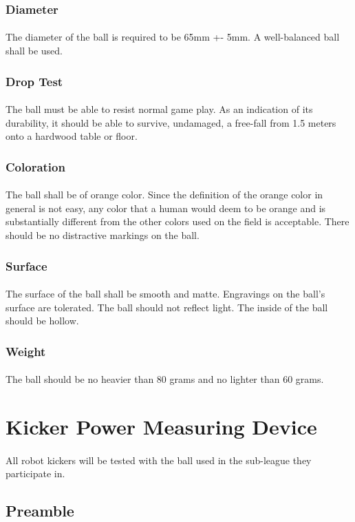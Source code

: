 \documentclass{article}
\newcommand*{\p}{\paragraph{}}
\begin{document}
\subsubsection{Diameter}

\p The diameter of the ball is required to be 65mm +- 5mm. A well-balanced ball
shall be used.

\subsubsection{Drop Test}

\p The ball must be able to resist normal game play. As an indication of its
durability, it should be able to survive, undamaged, a free-fall from 1.5
meters onto a hardwood table or floor.

\subsubsection{Coloration}

\p The ball shall be of orange color. Since the definition of the orange color in
general is not easy, any color that a human would deem to be orange and is
substantially different from the other colors used on the field is acceptable.
There should be no distractive markings on the ball.

\subsubsection{Surface}

\p The surface of the ball shall be smooth and matte. Engravings on the ball's
surface are tolerated. The ball should not reflect light. The inside of the
ball should be hollow.

\subsubsection{Weight}

\p The ball should be no heavier than 80 grams and no lighter than 60 grams.

\section{Kicker Power Measuring Device\label{ref-064}}

\p All robot kickers will be tested with the ball used in the sub-league they
participate in.

\subsection{Preamble}
\end{document}
